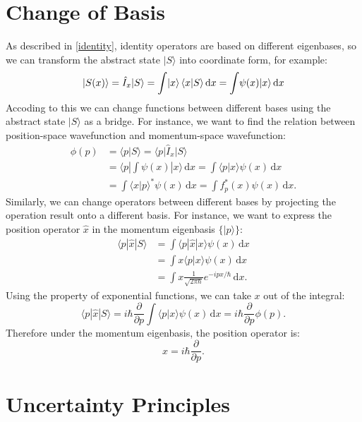 	\section{Change of Basis}
	As described in \ref{identity}, identity operators are based on different eigenbases, 
	so we can transform the abstract state $|S\rangle$ into coordinate form, for example:
	\[|S(x)\rangle = \hat{I}_{x}|S\rangle = \int\!\ket{x}\langle x|S \rangle\,\text{d}x = \int\!\psi(x)|x\rangle\,\text{d}x\]
	Accoding to this we can change functions between different bases using the abstract state $|S\rangle$ as a bridge. 
	For instance, we want to find the relation between position-space wavefunction and momentum-space wavefunction:
	\[\begin{aligned}
		\phi(p) & = \langle p|S\rangle = \langle p|\hat{I}_x|S\rangle \\
		& = \langle p | \int\!\psi(x)|x\rangle\,\text{d}x 
		 = \int \!\langle p|x \rangle \psi(x)\,\text{d}x \\
		& = \int \!\langle x|p \rangle^* \psi(x)\,\text{d}x 
		 = \int \!f_{p}^{*}(x)\psi(x)\,\text{d}x .
	\end{aligned}\]
	Similarly, we can change operators between different bases by projecting the operation result onto a different basis.
	For instance, we want to express the position operator $\hat{x}$ in the momentum eigenbasis $\{|p\rangle\}$:
	\[\begin{aligned}
		\langle p|\hat{x}|S \rangle
		& = \int\!\langle p|\hat{x}|x\rangle\psi(x)\,\text{d}x \\
		& = \int\!x\langle p|x\rangle\psi(x)\,\text{d}x \\
		& = \int\!x\frac{1}{\sqrt{2\pi\hbar}}e^{-ipx/\hbar}\,\text{d}x.
	\end{aligned}\]
	Using the property of exponential functions, we can take $x$ out of the integral:
	\[\langle p|\hat{x}|S \rangle = i\hbar\frac{\partial}{\partial p}\int\!\langle p|x\rangle\psi(x)\,\text{d}x = i\hbar\frac{\partial}{\partial p}\phi(p).\]
	Therefore under the momentum eigenbasis, the position operator is:
	\[\hat{x} = i\hbar\frac{\partial}{\partial p}.\]
	
	\section{Uncertainty Principles}
